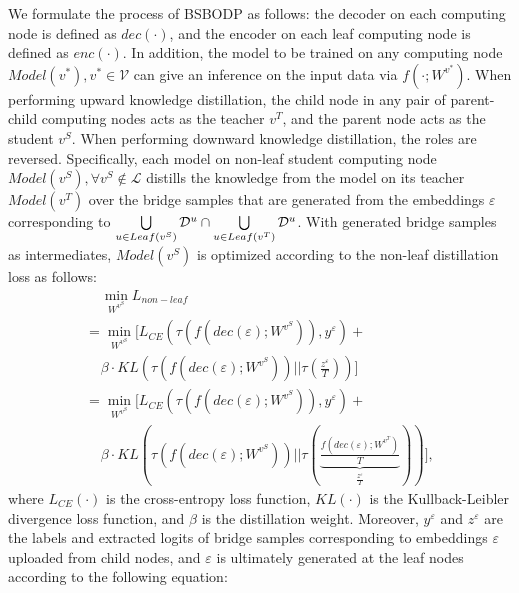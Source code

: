 \documentclass[10pt,journal]{IEEEtran}
\begin{document}
We formulate the process of BSBODP as follows: the decoder on each computing node is defined as $dec(\cdot)$, and the encoder on each leaf computing node is defined as $enc(\cdot)$. 
In addition, the model to be trained on any computing node $Model(v^*),v^* \in \mathcal{V}$ can give an inference on the input data via $f(\cdot;W^{v^*})$.
When performing upward knowledge distillation, the child node in any pair of parent-child computing nodes acts as the teacher $v^T$, and the parent node acts as the student $v^S$. When performing downward knowledge distillation, the roles are reversed.
Specifically, each model on non-leaf student computing node $Model(v^{S}),\forall v^{S}\notin \mathcal{L}$ distills the knowledge from the model on its teacher $Model(v^{T})$ over the bridge samples that are generated from the embeddings $\varepsilon$ corresponding to $
\bigcup\limits_{u \in Leaf({v^{S}})} {{{\cal D}^u}}  \cap \bigcup\limits_{u \in Leaf({v^{T}})} {{{\cal D}^u}}$.
With generated bridge samples as intermediates, $Model(v^{S})$ is optimized according to the non-leaf distillation loss as follows:
\begin{equation}
	\begin{array}{l}
	\; \; \; \; \mathop {\min }\limits_{{W^{{v^{S}}}}} {L_{non - leaf}}\\ 
	= \mathop {\min }\limits_{{W^{{v^{S}}}}} [{L_{CE}}(\tau (f(dec(\varepsilon );{W^{{v^{S}}}})),{y^\varepsilon }) + \\
	\; \; \; \; \beta  \cdot KL(\tau (f(dec(\varepsilon );{W^{{v^{S}}}}))||\tau (\frac{{{z^\varepsilon }}}{T}))]\\
	 = \mathop {\min }\limits_{{W^{{v^{S}}}}} [{L_{CE}}(\tau (f(dec(\varepsilon );{W^{{v^{S}}}})),{y^\varepsilon }) +
	 \\ \; \; \; \; \beta  \cdot KL(\tau (f(dec(\varepsilon );{W^{{v^{S}}}}))||\tau (\underbrace {\frac{{f(dec(\varepsilon );{W^{{v^{T}}}})}}{T}}_{\frac{{{z^\varepsilon }}}{T}}))],
	\end{array}
	\label{optim-non-leaf}
\end{equation}
where $L_{CE}(\cdot)$ is the cross-entropy loss function, $KL(\cdot)$ is the Kullback-Leibler divergence loss function, and $\beta$ is the distillation weight.
Moreover, $y^\varepsilon$ and $z^\varepsilon$ are the labels and extracted logits of bridge samples corresponding to embeddings $\varepsilon$ uploaded from child nodes, and $\varepsilon$ is ultimately generated at the leaf nodes according to the following equation:
\end{document}

